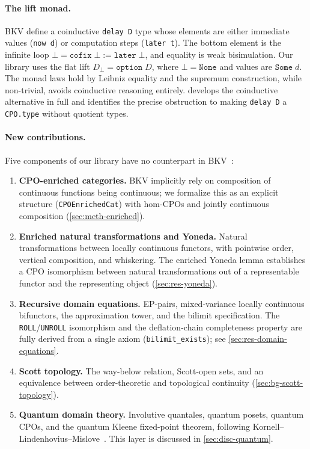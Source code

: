 \paragraph{The lift monad.}
BKV define a coinductive \texttt{delay D} type whose elements are
either immediate values (\texttt{now d}) or computation steps
(\texttt{later t}).
The bottom element is the infinite loop
$\bot = \texttt{cofix}\;\bot := \texttt{later}\;\bot$, and equality
is weak bisimulation.
Our library uses the flat lift $D_\bot = \texttt{option}\;D$, where
$\bot = \texttt{None}$ and values are $\texttt{Some}\;d$.
The monad laws hold by Leibniz equality and the supremum construction,
while non-trivial, avoids coinductive reasoning entirely.
 develops the coinductive alternative in
full and identifies the precise obstruction to making \texttt{delay D}
a \texttt{CPO.type} without quotient types.

\paragraph{New contributions.}
Five components of our library have no counterpart in
BKV~\cite{BKV2009}:
\begin{enumerate}
  \item \textbf{CPO-enriched categories.}
    BKV implicitly rely on composition of continuous functions being
    continuous; we formalize this as an explicit \HB{} structure
    (\texttt{CPOEnrichedCat}) with hom-CPOs and jointly continuous
    composition (\cref{sec:meth-enriched}).

  \item \textbf{Enriched natural transformations and Yoneda.}
    Natural transformations between locally continuous functors, with
    pointwise order, vertical composition, and whiskering. The
    enriched Yoneda lemma establishes a CPO isomorphism between
    natural transformations out of a representable functor and the
    representing object (\cref{sec:res-yoneda}).

  \item \textbf{Recursive domain equations.}
    EP-pairs, mixed-variance locally continuous bifunctors, the
    approximation tower, and the bilimit specification.
    The \texttt{ROLL}/\texttt{UNROLL} isomorphism and the deflation-chain
    completeness property are fully derived from a single axiom
    (\texttt{bilimit\_exists}); see \cref{sec:res-domain-equations}.

  \item \textbf{Scott topology.}
    The way-below relation, Scott-open sets, and an equivalence between
    order-theoretic and topological continuity
    (\cref{sec:bg-scott-topology}).

  \item \textbf{Quantum domain theory.}
    Involutive quantales, quantum posets, quantum CPOs, and the quantum
    Kleene fixed-point theorem, following
    Kornell--Lindenhovius--Mislove~\cite{KLM2024}.
    This layer is discussed in \cref{sec:disc-quantum}.
\end{enumerate}

